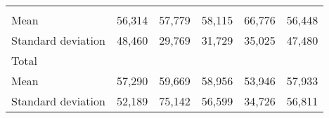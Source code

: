 \begin{tabular}{llllll}
  \multicolumn{1}{|r}{} &
  \multicolumn{1}{r}{} &
  \multicolumn{1}{r}{} &
  \multicolumn{1}{r}{} &
  \multicolumn{1}{r}{} \\
\multicolumn{1}{l}{\hspace{4em}Mean} &
  \multicolumn{1}{|r}{56,314} &
  \multicolumn{1}{r}{57,779} &
  \multicolumn{1}{r}{58,115} &
  \multicolumn{1}{r}{66,776} &
  \multicolumn{1}{r}{56,448} \\
\multicolumn{1}{l}{\hspace{4em}Standard deviation} &
  \multicolumn{1}{|r}{48,460} &
  \multicolumn{1}{r}{29,769} &
  \multicolumn{1}{r}{31,729} &
  \multicolumn{1}{r}{35,025} &
  \multicolumn{1}{r}{47,480} \\
\multicolumn{1}{l}{\hspace{3em}Total} &
  \multicolumn{1}{|r}{} &
  \multicolumn{1}{r}{} &
  \multicolumn{1}{r}{} &
  \multicolumn{1}{r}{} &
  \multicolumn{1}{r}{} \\
\multicolumn{1}{l}{\hspace{4em}Mean} &
  \multicolumn{1}{|r}{57,290} &
  \multicolumn{1}{r}{59,669} &
  \multicolumn{1}{r}{58,956} &
  \multicolumn{1}{r}{53,946} &
  \multicolumn{1}{r}{57,933} \\
\multicolumn{1}{l}{\hspace{4em}Standard deviation} &
  \multicolumn{1}{|r}{52,189} &
  \multicolumn{1}{r}{75,142} &
  \multicolumn{1}{r}{56,599} &
  \multicolumn{1}{r}{34,726} &
  \multicolumn{1}{r}{56,811} \\
\cline{1-6}
\end{tabular}

